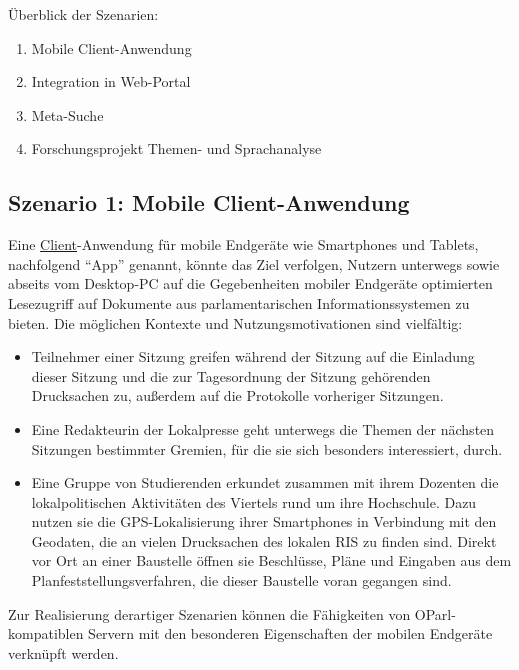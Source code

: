 \documentclass[,a4paper]{article}
\begin{document}
Überblick der Szenarien:

\begin{enumerate}
\def\labelenumi{\arabic{enumi}.}
\itemsep1pt\parskip0pt
\item
  Mobile Client-Anwendung
\item
  Integration in Web-Portal
\item
  Meta-Suche
\item
  Forschungsprojekt Themen- und Sprachanalyse
\end{enumerate}

\subsection{Szenario 1: Mobile
Client-Anwendung}\label{szenarioux5fmobileux5fclient}

Eine \hyperref[client]{Client}-Anwendung für mobile Endgeräte wie
Smartphones und Tablets, nachfolgend ``App'' genannt, könnte das Ziel
verfolgen, Nutzern unterwegs sowie abseits vom Desktop-PC auf die
Gegebenheiten mobiler Endgeräte optimierten Lesezugriff auf Dokumente
aus parlamentarischen Informationssystemen zu bieten. Die möglichen
Kontexte und Nutzungsmotivationen sind vielfältig:

\begin{itemize}
\item
  Teilnehmer einer Sitzung greifen während der Sitzung auf die Einladung
  dieser Sitzung und die zur Tagesordnung der Sitzung gehörenden
  Drucksachen zu, außerdem auf die Protokolle vorheriger Sitzungen.
\item
  Eine Redakteurin der Lokalpresse geht unterwegs die Themen der
  nächsten Sitzungen bestimmter Gremien, für die sie sich besonders
  interessiert, durch.
\item
  Eine Gruppe von Studierenden erkundet zusammen mit ihrem Dozenten die
  lokalpolitischen Aktivitäten des Viertels rund um ihre Hochschule.
  Dazu nutzen sie die GPS-Lokalisierung ihrer Smartphones in Verbindung
  mit den Geodaten, die an vielen Drucksachen des lokalen RIS zu finden
  sind. Direkt vor Ort an einer Baustelle öffnen sie Beschlüsse, Pläne
  und Eingaben aus dem Planfeststellungsverfahren, die dieser Baustelle
  voran gegangen sind.
\end{itemize}

Zur Realisierung derartiger Szenarien können die Fähigkeiten von
OParl-kompatiblen Servern mit den besonderen Eigenschaften der mobilen
Endgeräte verknüpft werden.
\end{document}
